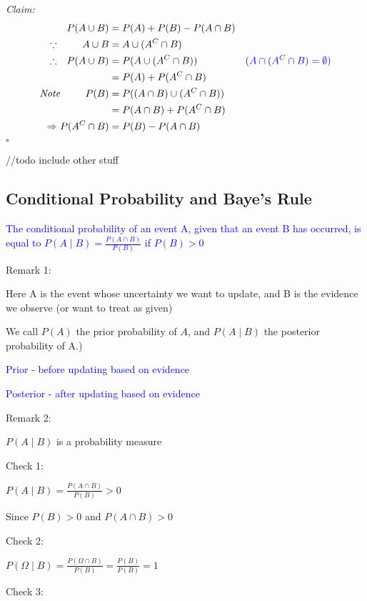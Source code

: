 \documentclass[12pt]{article}
\newcommand{\mathcomment}[0]{\quad\color{blue}}
\newcommand{\ddef}[1]{\textcolor{blue}{#1}}
\newenvironment{claim}{\textit{Claim:}}{\hfill $\square$}
\begin{document}
\begin{claim}
	\begin{equation}
		\begin{alignedat}{3}
		&& P(A \cup B) &= P(A) + P(B) - P(A \cap B) &\\
		\because \ && A \cup B &= A \cup (A^C \cap B) &\\
		\therefore \ && P(A \cup B) &= P(A \cup (A^C \cap B)) & \mathcomment (A \cap (A^C \cap B) = \emptyset) \\
		&&&= P(A) + P(A^C \cap B) &\\
		\textit{Note} && P(B) &= P((A \cap B) \cup (A^C \cap B)) &\\
		&&&= P(A \cap B) + P(A^C \cap B) &\\
		\Rightarrow \ && P(A^C \cap B) &= P(B) - P(A \cap B) &
		\end{alignedat}
	\end{equation}
\end{claim}

//todo include other stuff

\subsection{Conditional Probability and Baye's Rule}

\ddef{The conditional probability of an event A, given that an event B has occurred, is equal to $P(A \mid B) = \frac{P(A \cap B)}{P(B)}$ if $P(B) > 0$}

Remark 1:

Here A is the event whose uncertainty we want to update, and B is the evidence we observe (or want to treat as given)

We call \(P(A)\) the prior probability of \(A\), and \(P(A \mid B)\) the posterior probability of A.)

\ddef{Prior - before updating based on evidence}

\ddef{Posterior - after updating based on evidence}

Remark 2:

\(P(A \mid B)\) is a probability measure

Check 1:

\(P(A \mid B) = \frac{P(A \cap B)}{P(B)} > 0\)

Since \(P(B) > 0\) and \(P(A \cap B) > 0\)

Check 2:

\(P(\Omega \mid B) = \frac{P(\Omega \cap B)}{P(B)} = \frac{P(B)}{P(B)} = 1\)

Check 3:
\end{document}
